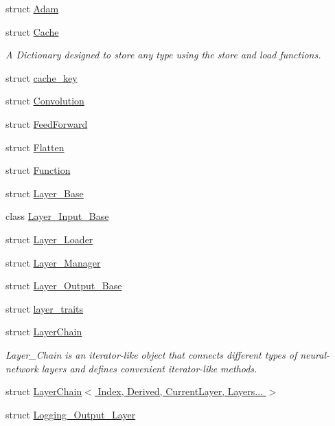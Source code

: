 \begin{DoxyCompactItemize}
\item 
struct \hyperlink{structbc_1_1nn_1_1Adam}{Adam}
\item 
struct \hyperlink{structbc_1_1nn_1_1Cache}{Cache}
\begin{DoxyCompactList}\small\item\em A Dictionary designed to store any type using the \textquotesingle{}store\textquotesingle{} and \textquotesingle{}load\textquotesingle{} functions. \end{DoxyCompactList}\item 
struct \hyperlink{structbc_1_1nn_1_1cache__key}{cache\+\_\+key}
\item 
struct \hyperlink{structbc_1_1nn_1_1Convolution}{Convolution}
\item 
struct \hyperlink{structbc_1_1nn_1_1FeedForward}{Feed\+Forward}
\item 
struct \hyperlink{structbc_1_1nn_1_1Flatten}{Flatten}
\item 
struct \hyperlink{structbc_1_1nn_1_1Function}{Function}
\item 
struct \hyperlink{structbc_1_1nn_1_1Layer__Base}{Layer\+\_\+\+Base}
\item 
class \hyperlink{classbc_1_1nn_1_1Layer__Input__Base}{Layer\+\_\+\+Input\+\_\+\+Base}
\item 
struct \hyperlink{structbc_1_1nn_1_1Layer__Loader}{Layer\+\_\+\+Loader}
\item 
struct \hyperlink{structbc_1_1nn_1_1Layer__Manager}{Layer\+\_\+\+Manager}
\item 
struct \hyperlink{structbc_1_1nn_1_1Layer__Output__Base}{Layer\+\_\+\+Output\+\_\+\+Base}
\item 
struct \hyperlink{structbc_1_1nn_1_1layer__traits}{layer\+\_\+traits}
\item 
struct \hyperlink{structbc_1_1nn_1_1LayerChain}{Layer\+Chain}
\begin{DoxyCompactList}\small\item\em Layer\+\_\+\+Chain is an iterator-\/like object that connects different types of neural-\/network layers and defines convenient iterator-\/like methods. \end{DoxyCompactList}\item 
struct \hyperlink{structbc_1_1nn_1_1LayerChain_3_01Index_00_01Derived_00_01CurrentLayer_00_01Layers_8_8_8_01_4}{Layer\+Chain$<$ Index, Derived, Current\+Layer, Layers... $>$}
\item 
struct \hyperlink{structbc_1_1nn_1_1Logging__Output__Layer}{Logging\+\_\+\+Output\+\_\+\+Layer}

\end{DoxyCompactItemize}
